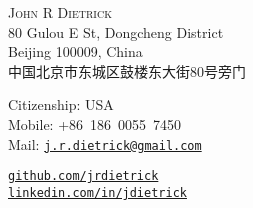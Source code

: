 \documentclass[10pt]{article}
\makeatletter
\def\spaceBetweenSections{\vspace{-10pt}}
\def\fullName{John R Dietrick}
\def\englishAddressLineOne{80 Gulou E St, Dongcheng District}
\def\englishAddressLineTwo{Beijing 100009, China}
\def\chineseAddress{中国北京市东城区鼓楼东大街80号旁门}
\def\citizenship{USA}
\def\mobileNumber{+86~186~0055~7450}
\def\emailAddress{j.r.dietrick@gmail.com}
\makeatother
\begin{document}
\begin{CJK}{UTF8}{gbsn}

\vspace{0pt}
\begin{center}
    \flushleft
    \begin{minipage}[b]{0.40\linewidth}
        \vspace{0pt}
        {\huge\textsc{\fullName}}\\
        \englishAddressLineOne\\
        \englishAddressLineTwo
        \ifx\USAVERSION\undefined
            \\\chineseAddress
        \fi
    \end{minipage}
    \begin{minipage}[b]{0.34\linewidth}
        \vspace{0pt}
        Citizenship: \citizenship\\
        Mobile: \mobileNumber\\
        Mail: \texttt{\small\href{mailto:\emailAddress}{\emailAddress}}
    \end{minipage}
    \begin{minipage}[b]{0.24\linewidth}
        \vspace{0pt}
        \texttt{\small\href{https://github.com/jrdietrick}{github.com/jrdietrick}}\\
        \texttt{\small\href{https://linkedin.com/in/jdietrick}{linkedin.com/in/jdietrick}}
    \end{minipage}
\end{center}

\spaceBetweenSections


\end{CJK}
\end{document}
